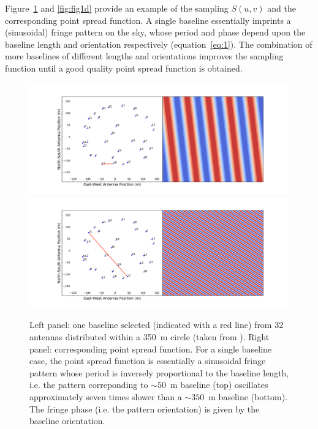 Figure~\ref{fig:fig1c} and \ref{fig:fig1d} provide an example of the sampling $S(u,v)$ and the corresponding point spread function. A single baseline essentially imprints a (sinusoidal) fringe pattern on the sky, whose period and phase depend upon the baseline length and orientation respectively (equation~\ref{eq:1}). The combination of more baselines of different lengths and orientations improves the sampling function until a good quality point spread function is obtained.
%
\begin{figure}[]
\begin{center}
\includegraphics[width=1.\textwidth]{Bernardi/fringe_bl_11_18}
\includegraphics[width=1.\textwidth]{Bernardi/fringe_bl_17_15}
\end{center}
\caption{Left panel: one baseline selected (indicated with a red line) from 32 antennas distributed within a 350~m circle (taken from \cite{jacobs11}). Right panel: corresponding point spread function. For a single baseline case, the point spread function is essentially a sinusoidal fringe pattern whose period is inversely proportional to the baseline length, i.e. the pattern correponding to $\sim 50$~m baseline (top) oscillates approximately seven times slower than a $\sim 350$~m baseline (bottom). The fringe phase (i.e. the pattern orientation) is given by the baseline orientation.}
\label{fig:fig1c}
\end{figure}
